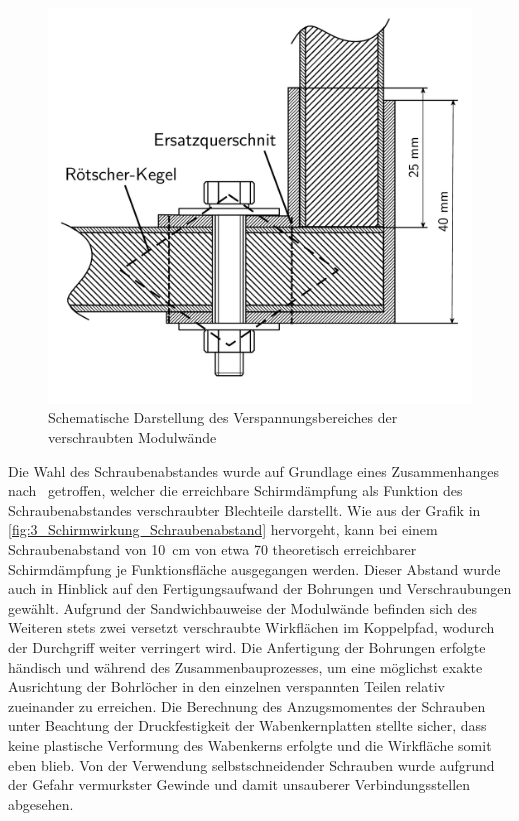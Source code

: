 \begin{figure}[ht]
    \centering
    \includegraphics[page=1, trim=1cm 1.5cm 1cm 1cm, clip, width = .45\textwidth]{Abbildungen/Kapitel3/Schematik_Verspannungskegel.pdf}
    \caption{Schematische Darstellung des Verspannungsbereiches der verschraubten Modulwände}
    \label{fig:3_Verspannungskegel_L-Profile}
\end{figure}


Die Wahl des Schraubenabstandes wurde auf Grundlage eines Zusammenhanges nach~\cite{Design_of_shielded_enclosures} getroffen, welcher die erreichbare Schirmdämpfung als Funktion des Schraubenabstandes verschraubter Blechteile darstellt. Wie aus der Grafik in \Abb\ref{fig:3_Schirmwirkung_Schraubenabstand} hervorgeht, kann bei einem Schraubenabstand von \SI{10}{\centi\meter} von etwa \SI{70}{\Dezibel} theoretisch erreichbarer Schirmdämpfung je Funktionsfläche ausgegangen werden. Dieser Abstand wurde auch in Hinblick auf den Fertigungsaufwand der Bohrungen und Verschraubungen gewählt. Aufgrund der Sandwichbauweise der Modulwände befinden sich des Weiteren stets zwei versetzt verschraubte Wirkflächen im Koppelpfad, wodurch der Durchgriff weiter verringert wird. Die Anfertigung der Bohrungen erfolgte händisch und während des Zusammenbauprozesses, um eine möglichst exakte Ausrichtung der Bohrlöcher in den einzelnen verspannten Teilen relativ zueinander zu erreichen. Die Berechnung des Anzugsmomentes der Schrauben unter Beachtung der Druckfestigkeit der Wabenkernplatten stellte sicher, dass keine plastische Verformung des Wabenkerns erfolgte und die Wirkfläche somit eben blieb. Von der Verwendung selbstschneidender Schrauben wurde aufgrund der Gefahr vermurkster Gewinde und damit unsauberer Verbindungsstellen abgesehen.  


